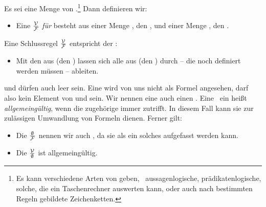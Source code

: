Es sei \objqt{\Formelmenge} eine Menge von .\footnote{%
	Es kann verschiedene Arten von  geben, \textzB\ aussagenlogische, prädikatenlogische, solche, die ein Taschenrechner auswerten kann, oder auch nach bestimmten Regeln gebildete Zeichenketten.%
}
Dann definieren wir:
\begin{itemize}
	\item Eine \emph{} $\frac{\mathcal{V}}{\mathcal{F}}$ \emph{für} \objqt{\Formelmenge} besteht aus einer Menge \objqt{\Voraussetzungsmenge \subseteq \Formelmenge}, den , und einer Menge \objqt{\Folgerungsmenge \subseteq \Formelmenge}, den .
\end{itemize}
Eine Schlussregel $\frac{\mathcal{V}}{\mathcal{F}}$ entspricht der :
%
\begin{itemize}
	\item Mit den  aus \objqt{\Voraussetzungsmenge} (den ) lassen sich alle  aus \objqt{\Folgerungsmenge} (den ) durch \emph{} -- die noch definiert werden müssen -- ableiten.
\end{itemize}
%
\objqt{\Voraussetzungsmenge} und \objqt{\Folgerungsmenge} dürfen auch leer sein.
Eine  wird von uns nicht als Formel angesehen, darf also kein Element von \objqt{\Voraussetzungsmenge} und \objqt{\Folgerungsmenge} sein.
Wir nennen eine  auch einen \emph{}.
Eine  \textbzw\ ein  heißt \emph{allgemeingültig}, wenn die zugehörige  immer zutrifft.
In diesem Fall kann sie zur zulässigen Umwandlung von Formeln dienen.
Ferner gilt:
%
\begin{itemize}
	\item Die  $\frac{\emptyset}{\mathcal{F}}$ nennen wir auch \emph{}, da sie als ein solches aufgefasst werden kann.
	\item Die  $\frac{\mathcal{V}}{\emptyset}$ ist allgemeingültig.
\end{itemize}

